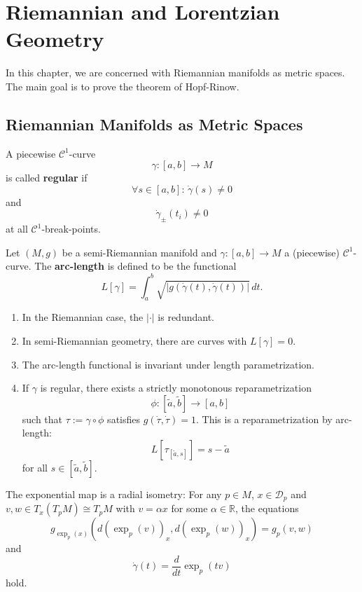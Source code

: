 \chapter{Riemannian and Lorentzian Geometry}
In this chapter, we are concerned with Riemannian manifolds as metric spaces. The main goal is to prove the theorem of Hopf-Rinow.
\section{Riemannian Manifolds as Metric Spaces}
\begin{definition}
   A piecewise $\mathcal{C}^1$-curve \[
       \gamma: [a,b] \to M
   \] is called \textbf{regular} if 
   \[
       \forall s \in [a,b]:\, \dot{\gamma}(s)\neq 0
   \] and \[
   \dot{\gamma}_{\pm}(t_i) \neq 0
   \] at all $\mathcal{C}^1$-break-points.
\end{definition} 
\begin{definition}
    Let $(M,g)$ be a semi-Riemannian manifold and $\gamma: [a,b]\to M$ a (piecewise) $\mathcal{C}^1$-curve. The \textbf{arc-length} is defined to be the functional
    \[
        L[\gamma] = \int_a^b \sqrt{| g(\dot{\gamma}(t), \dot{\gamma}(t))|} \, dt
    .\] 
\end{definition}
\begin{remark}
   \begin{enumerate}
      \item In the Riemannian case, the $| \cdot |$ is redundant.
        \item In semi-Riemannian geometry, there are curves with $L[\gamma]=0$.
        \item The arc-length functional is invariant under length parametrization.
        \item If $\gamma$ is regular, there exists a strictly monotonous reparametrization \[
            \phi: [\tilde{a}, \tilde{b}] \to [a,b] \] such that $\tau := \gamma \circ \phi$ satisfies $g(\dot{\tau}, \dot{\tau})=1$. This is a reparametrization by arc-length: \[
            L[\tau_{[\tilde{a},s]}]=s-\tilde{a}
        \] for all $s \in [\tilde{a}, \tilde{b}]$.
   \end{enumerate} 
\end{remark}

\begin{theorem}
   The exponential map is a radial isometry: For any $p \in M$, $x \in \mathcal{D}_p$ and $v,w \in T_x(T_pM) \cong T_pM$ with $v = \alpha x$ for some $\alpha \in \mathbb{R}$, the equations \[
       g_{\exp_p(x)}(d(\exp_p(v))_x, d(\exp_p(w))_x)=g_p(v,w)
   \]  and \[
   \dot{\gamma}(t)=\frac{d}{dt}\exp_p(tv)
   \] hold.
\end{theorem}


